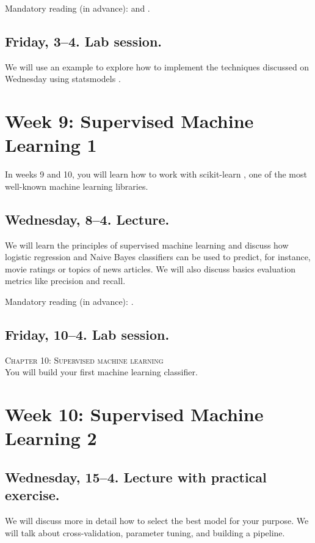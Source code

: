 Mandatory reading (in advance): \cite{Vliegenthart2014} and \cite{Strycharz2018}.


\subsection*{Friday, 3--4. Lab session.}
We will use an example to explore how to implement the techniques discussed on Wednesday using statsmodels \citep{statsmodels}.



\section*{Week 9: Supervised Machine Learning 1}
In weeks 9 and 10, you will learn how to work with scikit-learn \citep{scikit-learn}, one of the most well-known machine learning libraries.


\subsection*{Wednesday, 8--4. Lecture.}
We will learn the principles of supervised machine learning and discuss how logistic regression and Naive Bayes classifiers can be used to predict, for instance, movie ratings or topics of news articles. We will also discuss basics evaluation metrics like precision and recall.

Mandatory reading (in advance): \cite{burscher2014}. 

\subsection*{Friday, 10--4. Lab session.}
\textsc{ Chapter 10: Supervised machine learning}\\
You will build your first machine learning classifier.



\section*{Week 10: Supervised Machine Learning 2}

\subsection*{Wednesday, 15--4. Lecture with practical exercise.}
We will discuss more in detail how to select the best model for your purpose. We will talk about cross-validation, parameter tuning, and building a pipeline.

